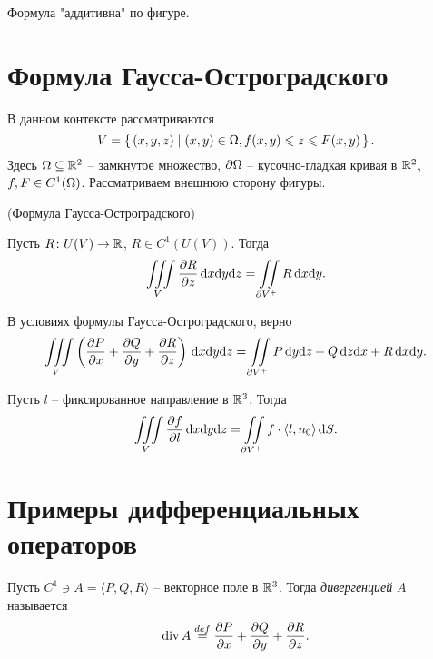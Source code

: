 \begin{remark}
    Формула "аддитивна" по фигуре.
\end{remark}

\section{Формула Гаусса-Остроградского}

\begin{remark}
    В данном контексте рассматриваются
\[
    V = \left\{\, (x, y, z) \mid (x, y) \in \Omega, f(x, y) \leqslant z \leqslant F(x, y) \,\right\}
.\] 
    Здесь $\Omega \subseteq \mathbb{R}^2$ -- замкнутое множество, $\partial \Omega$ -- кусочно-гладкая кривая
    в $\mathbb{R}^2$, $f, F \in C^1(\Omega)$. Рассматриваем внешнюю сторону фигуры.
\end{remark}

\begin{theorem}(Формула Гаусса-Остроградского)

    Пусть $R \colon U(V) \to \mathbb{R}$, $R \in C^1(U(V))$. Тогда
\[
    \iiint\limits_{V}{\dfrac{\partial R}{\partial z} \,\mathrm{d} x \mathrm{d} y \mathrm{d} z} = \iint\limits_{\partial V^+}{R \,\mathrm{d} x \mathrm{d} y}
.\] 
\end{theorem}

\begin{corollary}
    В условиях формулы Гаусса-Остроградского, верно
\[
    \iiint\limits_{V}{\left(\dfrac{\partial P}{\partial x} + \dfrac{\partial Q}{\partial y} + \dfrac{\partial R}{\partial z}\right) \,\mathrm{d} x \mathrm{d} y \mathrm{d} z} = 
    \iint\limits_{\partial V^+}{P \,\mathrm{d} y \mathrm{d} z + Q \,\mathrm{d} z \mathrm{d} x + R \,\mathrm{d} x \mathrm{d} y}
.\] 
\end{corollary}

\begin{corollary}
    Пусть $l$ -- фиксированное направление в $\mathbb{R}^3$. Тогда
\[
    \iiint\limits_{V}{\dfrac{\partial f}{\partial l} \,\mathrm{d} x \mathrm{d} y \mathrm{d} z} = 
    \iint\limits_{\partial V^+}{f \cdot \langle l, n_0 \rangle \,\mathrm{d} S}
.\] 
\end{corollary}

\section{Примеры дифференциальных операторов}

\begin{definition}
    Пусть $C^1 \ni A = \langle P, Q, R \rangle$ -- векторное поле в $\mathbb{R}^3$. Тогда
    \textit{дивергенцией} $A$ называется
\[
    \operatorname{div} A \overset{def}{\underset{}{=}} \dfrac{\partial P}{\partial x} + \dfrac{\partial Q}{\partial y} + \dfrac{\partial R}{\partial z}
.\] 
\end{definition}

